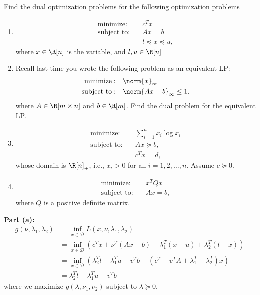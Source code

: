 \documentclass[11pt]{article}
\DeclareMathOperator{\minimize}{minimize:}
\DeclareMathOperator{\subjectto}{subject\ to:}
\begin{document}
\begin{homeworkProblem}
    Find the dual optimization problems for the following optimization problems
    \begin{enumerate}[label=(\alph*), topsep=5pt, itemsep=5pt]
        \item \begin{align*}
                  \minimize  & \quad  c^T x                  \\
                  \subjectto & \quad  Ax = b                 \\
                             & \quad  l \preceq x \preceq u,
              \end{align*} where $x \in \R[n]$ is the variable, and $l, u \in \R[n]$
        \item Recall last time you wrote the following problem as an equivalent LP:
              \begin{align*}
                  \minimize  & \quad  \norm{x}_\infty              \\
                  \subjectto & \quad  \norm{Ax - b}_\infty \leq 1.
              \end{align*} where $A \in \R[m \times n]$ and $b \in \R[m]$. Find the dual problem for the equivalent LP.
        \item \begin{align*}
                  \minimize  & \quad \sum_{i=1}^n x_i \log x_i \\
                  \subjectto & \quad Ax \succeq b,             \\
                             & \quad c^T x = d,
              \end{align*} whose domain is $\R[n]_+$, i.e., $x_i > 0$ for all $i = 1, 2, \ldots, n$. Assume $c \succeq 0$.
        \item \begin{align*}
                  \minimize  & \quad  x^T Q x \\
                  \subjectto & \quad  Ax = b,
              \end{align*} where $Q$ is a positive definite matrix. \newline
    \end{enumerate}

    \solution

    \textbf{Part (a):}
    \begin{align*}
        g(\nu, \lambda_1, \lambda_2) & = \inf_{x \in \mathcal{D}} L (x, \nu, \lambda_1, \lambda_2)                                                                \\
                                     & = \inf_{x \in \mathcal{D}} \left( c^T x + \nu^T (Ax - b) + \lambda_1^T (x-u) + \lambda_2^T (l-x) \right)                   \\
                                     & = \inf_{x \in \mathcal{D}} \left(\lambda_2^T l - \lambda_1^T u - v^T b + (c^T + v^T A + \lambda_1^T - \lambda_2^T)x\right) \\
                                     & = \lambda_2^T l - \lambda_1^T u - v^T b
    \end{align*} where we maximize $g(\lambda, \nu_1, \nu_2)$ subject to $\lambda \succeq 0$.


\end{homeworkProblem}
\end{document}
